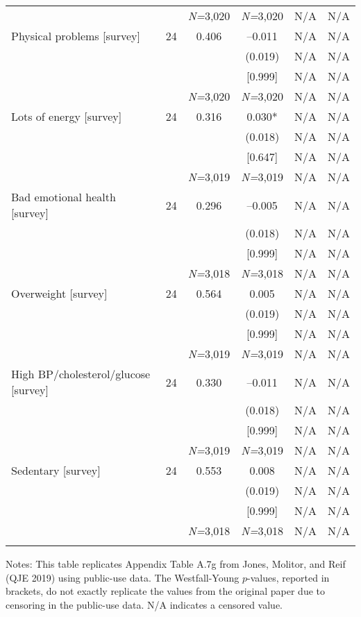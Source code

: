 \documentclass{article}
\begin{document}
\begin{table}[tbp]
{\begin{tabularx}{\linewidth}{lCCCCC}
&&\textit{N=}3,020&\textit{N=}3,020&N/A&N/A \tabularnewline
\addlinespace[1.2ex]
Physical problems [survey]&24&0.406&--0.011&N/A&N/A \tabularnewline
&&&(0.019)&N/A&N/A \tabularnewline
&&&[0.999]&N/A&N/A \tabularnewline
&&\textit{N=}3,020&\textit{N=}3,020&N/A&N/A \tabularnewline
\addlinespace[1.2ex]
Lots of energy [survey]&24&0.316&0.030*&N/A&N/A \tabularnewline
&&&(0.018)&N/A&N/A \tabularnewline
&&&[0.647]&N/A&N/A \tabularnewline
&&\textit{N=}3,019&\textit{N=}3,019&N/A&N/A \tabularnewline
\addlinespace[1.2ex]
Bad emotional health [survey]&24&0.296&--0.005&N/A&N/A \tabularnewline
&&&(0.018)&N/A&N/A \tabularnewline
&&&[0.999]&N/A&N/A \tabularnewline
&&\textit{N=}3,018&\textit{N=}3,018&N/A&N/A \tabularnewline
\addlinespace[1.2ex]
Overweight [survey]&24&0.564&0.005&N/A&N/A \tabularnewline
&&&(0.019)&N/A&N/A \tabularnewline
&&&[0.999]&N/A&N/A \tabularnewline
&&\textit{N=}3,019&\textit{N=}3,019&N/A&N/A \tabularnewline
\addlinespace[1.2ex]
High BP/cholesterol/glucose [survey]&24&0.330&--0.011&N/A&N/A \tabularnewline
&&&(0.018)&N/A&N/A \tabularnewline
&&&[0.999]&N/A&N/A \tabularnewline
&&\textit{N=}3,019&\textit{N=}3,019&N/A&N/A \tabularnewline
\addlinespace[1.2ex]
Sedentary [survey]&24&0.553&0.008&N/A&N/A \tabularnewline
&&&(0.019)&N/A&N/A \tabularnewline
&&&[0.999]&N/A&N/A \tabularnewline
&&\textit{N=}3,018&\textit{N=}3,018&N/A&N/A \tabularnewline
\bottomrule\addlinespace[-1.5ex] 

\end{tabularx}
\begin{flushleft}
\footnotesize Notes: This table replicates Appendix Table A.7g from Jones, Molitor, and Reif (QJE 2019) using public-use data. The Westfall-Young \(p\)-values, reported in brackets, do not exactly replicate the values from the original paper due to censoring in the public-use data. N/A indicates a censored value.
\end{flushleft}
}
\end{table}
\end{document}
